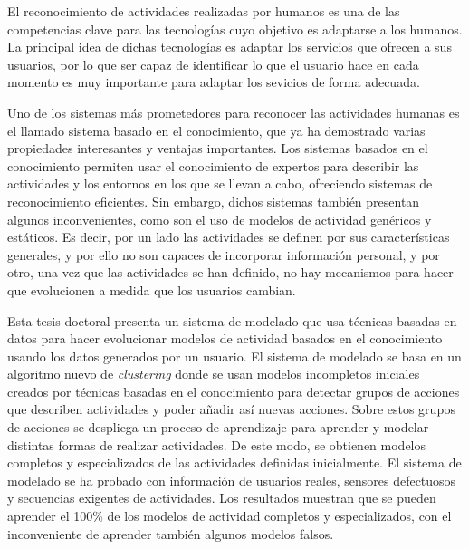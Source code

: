 \begin{resumen}        %



El reconocimiento de actividades realizadas por humanos es una de las competencias clave para las tecnologías cuyo objetivo es adaptarse a los humanos. La principal idea de dichas tecnologías es adaptar los servicios que ofrecen a sus usuarios, por lo que ser capaz de identificar lo que el usuario hace en cada momento es muy importante para adaptar los sevicios de forma adecuada.

Uno de los sistemas más prometedores para reconocer las actividades humanas es el llamado sistema basado en el conocimiento, que ya ha demostrado varias propiedades interesantes y ventajas importantes. Los sistemas basados en el conocimiento permiten usar el conocimiento de expertos para describir las actividades y los entornos en los que se llevan a cabo, ofreciendo sistemas de reconocimiento eficientes. Sin embargo, dichos sistemas también presentan algunos inconvenientes, como son el uso de modelos de actividad genéricos y estáticos. Es decir, por un lado las actividades se definen por sus características generales, y por ello no son capaces de incorporar información personal, y por otro, una vez que las actividades se han definido, no hay mecanismos para hacer que evolucionen a medida que los usuarios cambian.

Esta tesis doctoral presenta un sistema de modelado que usa técnicas basadas en datos para hacer evolucionar modelos de actividad basados en el conocimiento usando los datos generados por un usuario. El sistema de modelado se basa en un algoritmo nuevo de \textit{clustering} donde se usan modelos incompletos iniciales creados por técnicas basadas en el conocimiento para detectar grupos de acciones que describen actividades y poder añadir así nuevas acciones. Sobre estos grupos de acciones se despliega un proceso de aprendizaje para aprender y modelar distintas formas de realizar actividades. De este modo, se obtienen modelos completos y especializados de las actividades definidas inicialmente. El sistema de modelado se ha probado con información de usuarios reales, sensores defectuosos y secuencias exigentes de actividades. Los resultados muestran que se pueden aprender el 100\% de los modelos de actividad completos y especializados, con el inconveniente de aprender también algunos modelos falsos.


\end{resumen}


